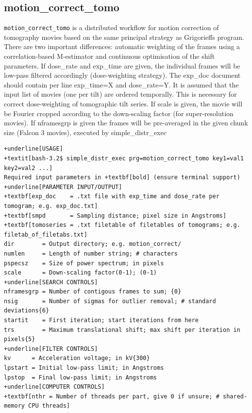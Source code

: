\documentclass[a4paper,11pt]{article}
\newcommand{\prgname}[1]{\textcolor{NavyBlue}{\texttt{#1}}}
\begin{document}
\subsection{motion\_correct\_tomo}
\label{motion_correct_tomo}
\prgname{motion\_correct\_tomo} is a distributed workflow for motion correction of tomography movies based on the same principal strategy as Grigorieffs program. There are two important differences: automatic weighting of the frames using a correlation-based M-estimator and continuous optimisation of the shift parameters. If dose\_rate and exp\_time are given, the individual frames will be low-pass filtered accordingly (dose-weighting strategy). The exp\_doc document should contain per line exp\_time=X and dose\_rate=Y. It is assumed that the input list of movies (one per tilt) are ordered temporally. This is necessary for correct dose-weighting of tomographic tilt series. If scale is given, the movie will be Fourier cropped according to the down-scaling factor (for super-resolution movies). If nframesgrp is given the frames will be pre-averaged in the given chunk size (Falcon 3 movies), executed by simple\_distr\_exec
\begin{Verbatim}[commandchars=+\[\],fontsize=\small,breaklines=true]
+underline[USAGE]
+textit[bash-3.2$ simple_distr_exec prg=motion_correct_tomo key1=val1 key2=val2 ...]
Required input parameters in +textbf[bold] (ensure terminal support)
+underline[PARAMETER INPUT/OUTPUT]
+textbf[exp_doc    = .txt file with exp_time and dose_rate per tomogram; e.g. exp_doc.txt]
+textbf[smpd       = Sampling distance; pixel size in Angstroms]
+textbf[tomoseries = .txt filetable of filetables of tomograms; e.g. filetab_of_filetabs.txt]
dir        = Output directory; e.g. motion_correct/
numlen     = Length of number string; # characters
pspecsz    = Size of power spectrum; in pixels
scale      = Down-scaling factor(0-1); (0-1)
+underline[SEARCH CONTROLS]
nframesgrp = Number of contigous frames to sum; {0}
nsig       = Number of sigmas for outlier removal; # standard deviations{6}
startit    = First iteration; start iterations from here
trs        = Maximum translational shift; max shift per iteration in pixels{5}
+underline[FILTER CONTROLS]
kv      = Acceleration voltage; in kV{300}
lpstart = Initial low-pass limit; in Angstroms
lpstop  = Final low-pass limit; in Angstroms
+underline[COMPUTER CONTROLS]
+textbf[nthr = Number of threads per part, give 0 if unsure; # shared-memory CPU threads]
\end{Verbatim}
\end{document}
